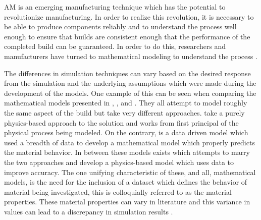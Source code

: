 \label{introAMsim}

\Acf{AM} is an emerging manufacturing technique which has the potential to revolutionize manufacturing.  In order to realize this revolution, it is necessary to be able to produce components reliably and to understand the process well enough to ensure that builds are consistent enough that the performance of the completed build can be guaranteed.  In order to do this, researchers and manufacturers have turned to mathematical modeling to understand the process \cite{wangClosedLoopHighFidelitySimulation2021}.

The differences in simulation techniques can vary based on the desired response from the simulation and the underlying assumptions which were made during the development of the models.
One example of this can be seen when comparing the mathematical models presented in \cite{wangClosedLoopHighFidelitySimulation2021}, \cite{royDatadrivenModelingThermal2020}, and \cite{mogesHYBRIDMODELINGAPPROACH2020}.  They all attempt to model roughly the same aspect of the build but take very different approaches.
\cite{wangClosedLoopHighFidelitySimulation2021} take a purely physics-based approach to the solution and works from first principal of the physical process being modeled.
On the contrary, \cite{royDatadrivenModelingThermal2020} is a data driven model which used a breadth of data to develop a mathematical model which properly predicts the material behavior. 
In between these models exists \cite{mogesHYBRIDMODELINGAPPROACH2020} which attempts to marry the two approaches and develop a physics-based model which uses data to improve accuracy.
The one unifying characteristic of these, and all, mathematical models, is the need for the inclusion of a dataset which defines the behavior of material being investigated, this is colloquially referred to as the material properties.  These material properties can vary in literature and this variance in values can lead to a discrepancy in simulation results \cite{Daryabeigi2011}.


